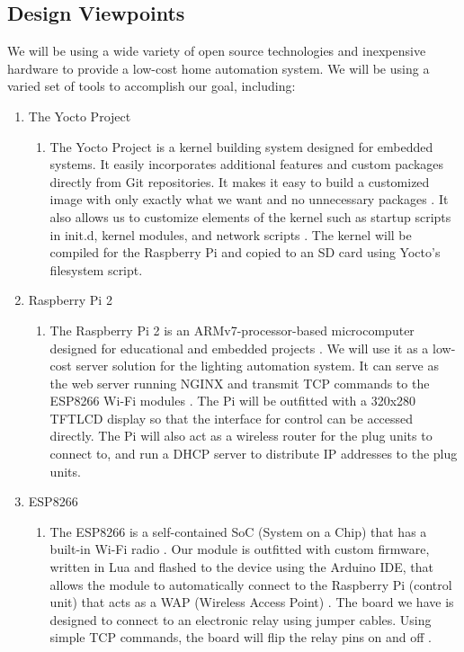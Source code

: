 \subsection{Design Viewpoints}

We will be using a wide variety of open source technologies and inexpensive
hardware to provide a low-cost home automation system. We will be using a
varied set of tools to accomplish our goal, including:

\begin{enumerate}
    \item The Yocto Project 
    \begin{enumerate}
        \item The Yocto Project is a kernel building system designed for
            embedded systems. It easily incorporates additional features and
            custom packages directly from Git repositories. It makes it easy to
            build a customized image with only exactly what we want and no
            unnecessary packages \cite{yocto}. It also allows us to customize
            elements of the kernel such as startup scripts in init.d, kernel
            modules, and network scripts \cite{flask}. The kernel will be
            compiled for the Raspberry Pi and copied to an SD card using
            Yocto's filesystem script.
    \end{enumerate} 
        \item Raspberry Pi 2
    \begin{enumerate}
        \item The Raspberry Pi 2 is an ARMv7-processor-based microcomputer
            designed for educational and embedded projects \cite{raspi}. We
            will use it as a low-cost server solution for the lighting
            automation system. It can serve as the web server running NGINX and
            transmit TCP commands to the ESP8266 Wi-Fi modules \cite{nginx}.
            The Pi will be outfitted with a 320x280 TFTLCD display
            \cite{tftlcd} so that the interface for control can be accessed
            directly.  The Pi will also act as a wireless router for the plug
            units to connect to, and run a DHCP server to distribute IP
            addresses to the plug units.
    \end{enumerate} 
        \item ESP8266
    \begin{enumerate}
        \item The ESP8266 is a self-contained SoC (System on a Chip) that has a
            built-in Wi-Fi radio \cite{esp8266}. Our module is outfitted with
            custom firmware, written in Lua and flashed to the device using the
            Arduino IDE, that allows the module to automatically connect to the
            Raspberry Pi (control unit) that acts as a WAP (Wireless Access
            Point) \cite{lua}. The board we have is designed to connect to an
            electronic relay using jumper cables. Using simple TCP commands,
            the board will flip the relay pins on and off \cite{relay}.
    \end{enumerate}
\end{enumerate}

